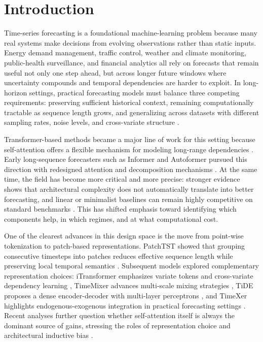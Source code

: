 \documentclass{ieeeaccess}
\begin{document}
\titlepgskip=-15pt

\maketitle

\section{Introduction}

Time-series forecasting is a foundational machine-learning problem because many real
systems make decisions from evolving observations rather than static inputs. Energy
demand management, traffic control, weather and climate monitoring, public-health
surveillance, and financial analytics all rely on forecasts that remain useful not
only one step ahead, but across longer future windows where uncertainty compounds and
temporal dependencies are harder to exploit. In long-horizon settings, practical
forecasting models must balance three competing requirements: preserving sufficient
historical context, remaining computationally tractable as sequence length grows, and
generalizing across datasets with different sampling rates, noise levels, and
cross-variate structure \cite{zhou2021informer,wu2021autoformer,kim2022revin}.

Transformer-based methods became a major line of work for this setting because
self-attention offers a flexible mechanism for modeling long-range dependencies
\cite{vaswani2017attention}. Early long-sequence forecasters such as Informer and
Autoformer pursued this direction with redesigned attention and decomposition
mechanisms \cite{zhou2021informer,wu2021autoformer}. At the same time, the field has
become more critical and more precise: stronger evidence shows that architectural
complexity does not automatically translate into better forecasting, and linear or
minimalist baselines can remain highly competitive on standard benchmarks
\cite{zeng2023transformers}. This has shifted emphasis toward identifying which
components help, in which regimes, and at what computational cost.

One of the clearest advances in this design space is the move from point-wise
tokenization to patch-based representations. PatchTST showed that grouping consecutive
timesteps into patches reduces effective sequence length while preserving local temporal
semantics \cite{nie2023patchtst}. Subsequent models explored complementary
representation choices: iTransformer emphasizes variate tokens and cross-variate
dependency learning \cite{liu2024itransformer}, TimeMixer advances multi-scale mixing
strategies \cite{wang2024timemixer}, TiDE proposes a dense encoder-decoder with
multi-layer perceptrons \cite{das2023tide}, and TimeXer highlights
endogenous-exogenous integration in practical forecasting settings
\cite{wang2024timexer}. Recent analyses further question whether self-attention itself
is always the dominant source of gains, stressing the roles of representation choice
and architectural inductive bias \cite{selfattention2024tsf,closerlook2024tsf}.
\end{document}
